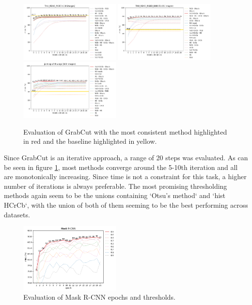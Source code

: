 \documentclass[conference]{IEEEtran}
\begin{document}
\begin{figure}[h]  %
	\begin{center}
		\includegraphics[width=0.45\textwidth]{images/THU_READ_RGBD_grabcut.png}
		\includegraphics[width=0.45\textwidth]{images/THU_READ_RGBD_BODIES_grabcut.png}
		\includegraphics[width=0.45\textwidth]{images/joint-ep-of-thu-ego_grabcut.png}
	\end{center}
	\caption{Evaluation of GrabCut with the most consistent method highlighted in red and the baseline highlighted in yellow.}
	\label{fig:grabcut}
\end{figure}

Since GrabCut is an iterative approach, a range of 20 steps was evaluated. As can be seen in figure \ref{fig:grabcut}, most methods converge around the 5-10th iteration and all are monotonically increasing. Since time is not a constraint for this task, a higher number of iterations is always preferable. The most promising thresholding methods again seem to be the unions containing `Otsu's method` and `hist HCrCb`, with the union of both of them seeming to be the best performing across datasets. \\

\begin{figure}[h]
	\begin{center}
		\includegraphics[width=0.45\textwidth]{images/mask_r-cnn.png}
	\end{center}
	\caption{Evaluation of Mask R-CNN epochs and thresholds.}
	\label{fig:MASK R-CNN}
\end{figure}
\end{document}

